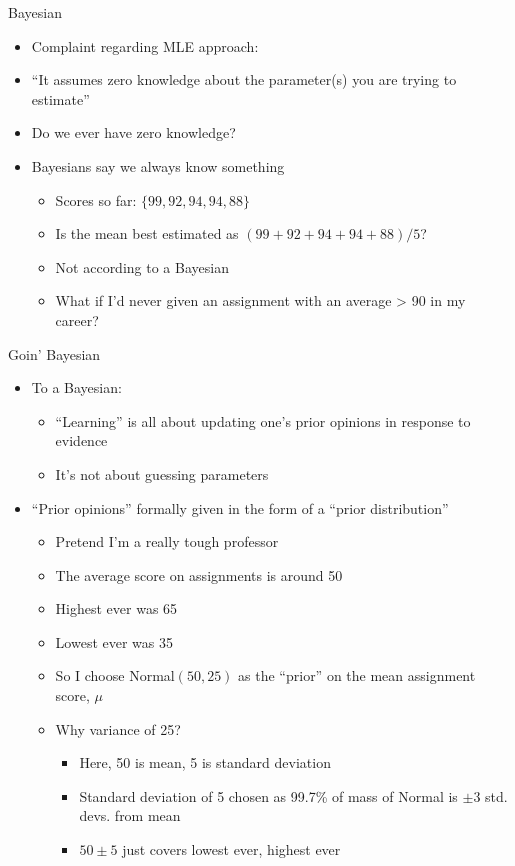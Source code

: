 \documentclass[aspectratio=169]{beamer}
\begin{document}
\begin{frame}{Bayesian}

\begin{itemize}
	\item Complaint regarding MLE approach:
	\item ``It assumes zero knowledge about the parameter(s) you are trying to estimate''
	\item Do we ever have zero knowledge?
	\item Bayesians say we always know something
	\begin{itemize}
		\item Scores so far: $\{99, 92, 94, 94, 88\}$
		\item Is the mean best estimated as $(99 + 92 + 94 + 94 + 88) / 5$?
		\item Not according to a Bayesian
		\item What if I'd never given an assignment with an average > 90 in my career?
	\end{itemize}
\end{itemize}
	\end{frame}

\begin{frame}{Goin' Bayesian}

\begin{itemize}
	\item To a Bayesian:
	\begin{itemize}
		\item ``Learning'' is all about updating one's prior opinions in response to evidence
		\item It's not about guessing parameters
	\end{itemize}
	\item ``Prior opinions'' formally given in the form of a ``prior distribution''
	\begin{itemize}
		\item Pretend I'm a really tough professor
		\item The average score on assignments is around 50
		\item Highest ever was 65
		\item Lowest ever was 35
		\item So I choose Normal$(50, 25)$ as the ``prior'' on the mean assignment score, $\mu$
		\item Why variance of 25?
		\begin{itemize}
		\item Here, 50 is mean, 5 is standard deviation
		\item Standard deviation of 5 chosen as 99.7\% of mass of Normal is $\pm3$ std. devs. from mean
		\item $50 \pm 5$ just covers lowest ever, highest ever
		\end{itemize}
	\end{itemize}
\end{itemize}
\end{frame}
\end{document}
